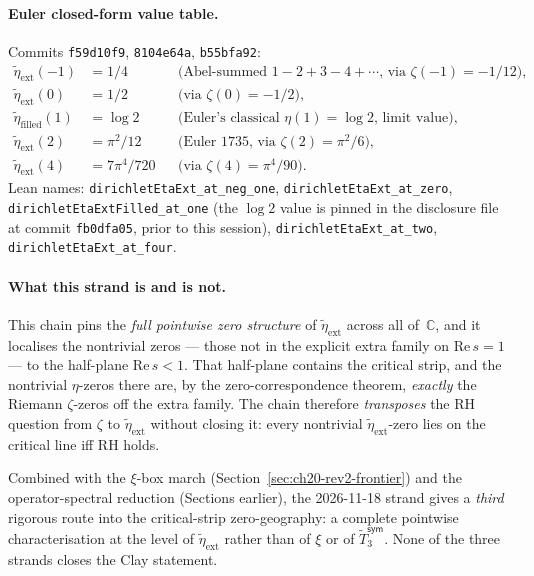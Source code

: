 \paragraph{Euler closed-form value table.}
Commits \texttt{f59d10f9}, \texttt{8104e64a}, \texttt{b55bfa92}:
\begin{align*}
\widetilde{\eta}_{\mathrm{ext}}(-1) &= 1/4
  &&\text{(Abel-summed }1 - 2 + 3 - 4 + \cdots\text{, via }\zeta(-1) = -1/12),\\
\widetilde{\eta}_{\mathrm{ext}}(0) &= 1/2
  &&\text{(via }\zeta(0) = -1/2),\\
\widetilde{\eta}_{\mathrm{filled}}(1) &= \log 2
  &&\text{(Euler's classical }\eta(1) = \log 2\text{, limit value)},\\
\widetilde{\eta}_{\mathrm{ext}}(2) &= \pi^2/12
  &&\text{(Euler 1735, via }\zeta(2) = \pi^2/6),\\
\widetilde{\eta}_{\mathrm{ext}}(4) &= 7\pi^4/720
  &&\text{(via }\zeta(4) = \pi^4/90).
\end{align*}
Lean names: \texttt{dirichletEtaExt\_at\_neg\_one},
\texttt{dirichletEtaExt\_at\_zero}, \texttt{dirichletEtaExtFilled\_at\_one}
(the $\log 2$ value is pinned in the disclosure file at commit
\texttt{fb0dfa05}, prior to this session), \texttt{dirichletEtaExt\_at\_two},
\texttt{dirichletEtaExt\_at\_four}.

\paragraph{What this strand is and is not.}
This chain pins the \emph{full pointwise zero structure} of
$\widetilde{\eta}_{\mathrm{ext}}$ across all of~$\mathbb{C}$, and it
localises the nontrivial zeros --- those not in the explicit extra
family on $\mathrm{Re}\,s = 1$ --- to the half-plane
$\mathrm{Re}\,s < 1$.  That half-plane contains the critical strip,
and the nontrivial $\eta$-zeros there are, by the zero-correspondence
theorem, \emph{exactly} the Riemann $\zeta$-zeros off the extra
family.  The chain therefore \emph{transposes} the RH question from
$\zeta$ to $\widetilde{\eta}_{\mathrm{ext}}$ without closing it:
every nontrivial $\widetilde{\eta}_{\mathrm{ext}}$-zero lies on the
critical line iff RH holds.

Combined with the $\xi$-box march (Section~\ref{sec:ch20-rev2-frontier})
and the operator-spectral reduction (Sections earlier), the
2026-11-18 strand gives a \emph{third} rigorous route into the
critical-strip zero-geography: a complete pointwise characterisation
at the level of $\widetilde{\eta}_{\mathrm{ext}}$ rather than of
$\xi$ or of $\tilde{T}_3^{\textsf{sym}}$.  None of the three strands
closes the Clay statement.


